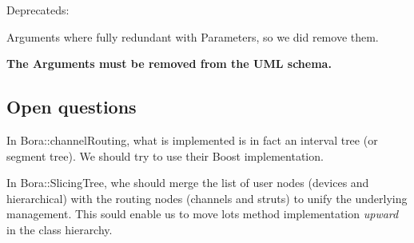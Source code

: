 Deprecateds\+:


\begin{DoxyEnumerate}
\item {\ttfamily Arguments} where fully redundant with Parameters, so we did remove them.

{\bfseries The Arguments must be removed from the U\+ML schema.}
\end{DoxyEnumerate}\hypertarget{index_ssecOpenQuestions}{}\subsection{Open questions}\label{index_ssecOpenQuestions}

\begin{DoxyEnumerate}
\item In Bora\+::channel\+Routing, what is implemented is in fact an interval tree (or segment tree). We should try to use their {\ttfamily Boost} implementation.
\item In Bora\+::\+Slicing\+Tree, whe should merge the list of user nodes (devices and hierarchical) with the routing nodes (channels and struts) to unify the underlying management. This sould enable us to move lots method implementation {\itshape upward} in the class hierarchy. 
\end{DoxyEnumerate}